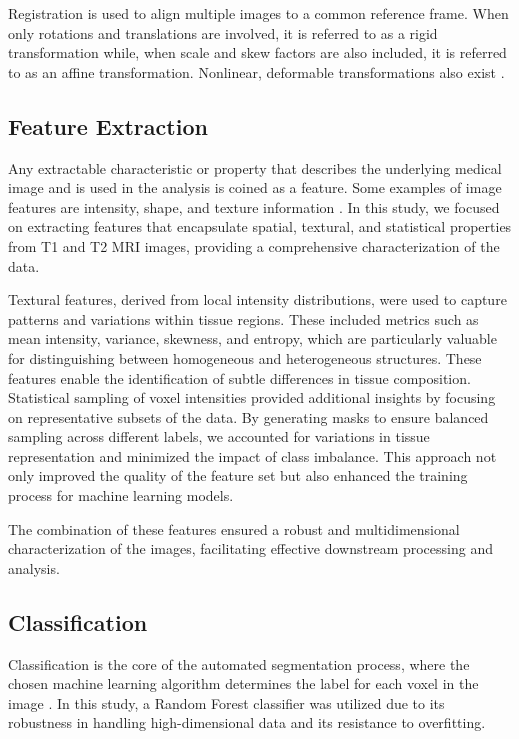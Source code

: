 Registration is used to align multiple images to a common reference frame. When only rotations and translations are involved, it is referred to as a rigid transformation while, when scale and skew factors are also included, it is referred to as an affine transformation. Nonlinear, deformable transformations also exist \cite{b10}.

\subsection{Feature Extraction}

Any extractable characteristic or property that describes the underlying medical image and is used in the analysis is coined as a feature. Some examples of image features are intensity, shape, and texture information \cite{b8}. In this study, we focused on extracting features that encapsulate spatial, textural, and statistical properties from T1 and T2 MRI images, providing a comprehensive characterization of the data.

Textural features, derived from local intensity distributions, were used to capture patterns and variations within tissue regions. These included metrics such as mean intensity, variance, skewness, and entropy, which are particularly valuable for distinguishing between homogeneous and heterogeneous structures. These features enable the identification of subtle differences in tissue composition. Statistical sampling of voxel intensities provided additional insights by focusing on representative subsets of the data. By generating masks to ensure balanced sampling across different labels, we accounted for variations in tissue representation and minimized the impact of class imbalance. This approach not only improved the quality of the feature set but also enhanced the training process for machine learning models.

The combination of these features ensured a robust and multidimensional characterization of the images, facilitating effective downstream processing and analysis.

\subsection{Classification}

Classification is the core of the automated segmentation process, where the chosen machine learning algorithm determines the label for each voxel in the image \cite{b8}. In this study, a Random Forest classifier was utilized due to its robustness in handling high-dimensional data and its resistance to overfitting.

